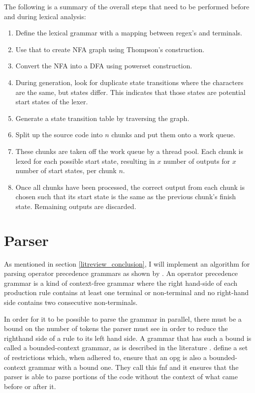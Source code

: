 The following is a summary of the overall steps that need to be performed before
and during lexical analysis:

\begin{enumerate}
	\item Define the lexical grammar with a mapping between regex's and terminals.
	\item Use that to create NFA graph using Thompson's construction.
	\item Convert the NFA into a DFA using powerset construction.
	\item During generation, look for duplicate state transitions where the
		  characters are the same, but states differ. This indicates that those
		  states are potential start states of the lexer.
	\item Generate a state transition table by traversing the graph.
	\item Split up the source code into $n$ chunks and put them onto a work queue.
	\item These chunks are taken off the work queue by a thread pool. Each chunk
		  is lexed for each possible start state, resulting in $x$ number of outputs for $x$
		  number of start states, per chunk $n$.
	\item Once all chunks have been processed, the correct output from each chunk is
		  chosen such that its start state is the same as the previous chunk's finish
    	  state. Remaining outputs are discarded.
\end{enumerate}

\section{Parser} \label{design_parser}

As mentioned in section \ref{litreview_conclusion}, I will implement
an algorithm for parsing operator precedence grammars as shown by
\cite{barenghi_parallel_2015}. An operator precedence grammar is a kind of
context-free grammar where the right hand-side of each production rule contains
at least one terminal or non-terminal and no right-hand side contains two
consecutive non-terminals. 

In order for it to be possible to parse the grammar in parallel, there must
be a bound on the number of tokens the parser must see in order to reduce
the righthand side of a rule to its left hand side. A grammar that has such a
bound is called a bounded-context grammar, as is described in the literature
\citep{grune_parsing_2008}. \cite{barenghi_parallel_2015} define a set of
restrictions which, when adhered to, ensure that an \gls{opg} is also a
bounded-context grammar with a bound one. They call this \gls{fnf} and it
ensures that the parser is able to parse portions of the code without the
context of what came before or after it.

